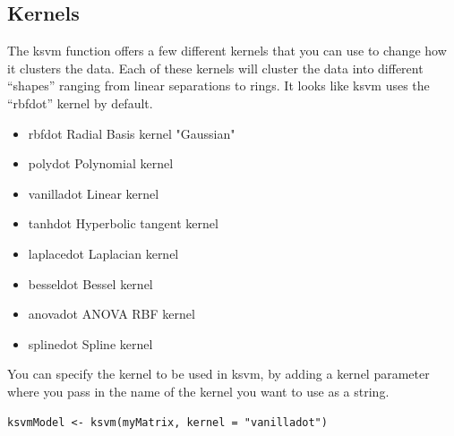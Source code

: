\subsection{Kernels}
The ksvm function offers a few different kernels that you can use to change how it clusters the data. Each of these kernels will cluster the data into different ``shapes'' ranging from linear separations to rings. It looks like ksvm uses the ``rbfdot'' kernel by default.

\begin{itemize}
	\item rbfdot Radial Basis kernel "Gaussian"
	\item polydot Polynomial kernel
	\item vanilladot Linear kernel
	\item tanhdot Hyperbolic tangent kernel
	\item laplacedot Laplacian kernel
	\item besseldot Bessel kernel
	\item anovadot ANOVA RBF kernel
	\item splinedot Spline kernel
\end{itemize}

You can specify the kernel to be used in ksvm, by adding a kernel parameter where you pass in the name of the kernel you want to use as a string.

\begin{verbatim}
ksvmModel <- ksvm(myMatrix, kernel = "vanilladot")
\end{verbatim}

